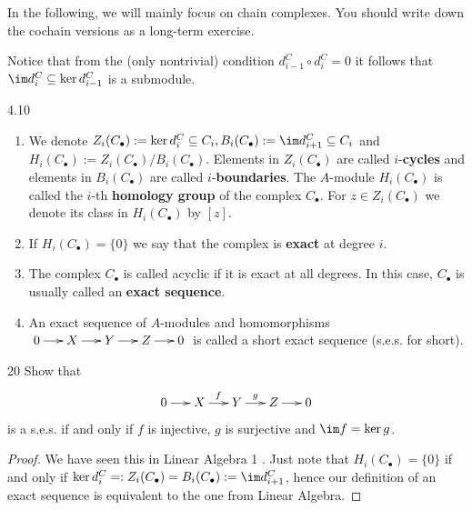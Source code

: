 \documentclass[twoside = false,	%
		headsepline,		%
		parskip = true,
		]{scrbook}						%
\begin{document}
        In the following, we will mainly focus on chain complexes. You should write down the cochain versions as a long-term exercise.

        Notice that from the (only nontrivial) condition $d_{i-1}^C \circ d_i^C = 0$ it follows that $\im d_i^C \subseteq \ker d_{i-1}^C$ is a submodule.

        \begin{definition}{}{4.10}
            \begin{enumerate}
                \item We denote $Z_i(C_\bullet):= \ker d_i^C \subseteq C_i, B_i(C_\bullet):=\im d_{i+1}^C \subseteq C_i$ and $H_i(C_\bullet):= Z_i(C_\bullet)/B_i(C_\bullet)$. Elements in $Z_i(C_\bullet)$ are called $i$-\textbf{cycles} and elements in $B_i(C_\bullet)$ are called $i$-\textbf{boundaries}. The $A$-module $H_i(C_\bullet)$ is called the $i$-th \textbf{homology group} of the complex $C_\bullet$. For $z \in Z_i(C_\bullet)$ we denote its class in $H_i(C_\bullet)$ by $[z]$.
                
                \item If $H_i(C_\bullet) = \{0\}$ we say that the complex is \textbf{exact} at degree $i$.
                
                \item The complex $C_\bullet$ is called acyclic if it is exact at all degrees. In this case, $C_\bullet$ is usually called an \textbf{exact sequence}.
    
                \item An exact sequence of $A$-modules and homomorphisms $\xymatrix@C=15pt{0 \ar[r] & X \ar[r] & Y \ar[r] & Z \ar[r] & 0}$ is called a short exact sequence (s.e.s. for short).
            \end{enumerate}
        \end{definition}

        \begin{exercise}{}{20}
            Show that
            \begin{equation*}
                \xymatrix@C=15pt {
                    0 \ar[r] & X \ar[r]^f & Y \ar[r]^g & Z \ar[r] & 0
                }
            \end{equation*}
            is a s.e.s. if and only if $f$ is injective, $g$ is surjective and $\im f = \ker g$.
        \end{exercise}
        \begin{proof}
            We have seen this in Linear Algebra 1 \cite{LA}. Just note that $H_i(C_\bullet) = \{0\}$ if and only if $\ker d_i^C =: Z_i(C_\bullet) = B_i(C_\bullet) := \im d_{i+1}^C$, hence our definition of an exact sequence is equivalent to the one from Linear Algebra.
        \end{proof}
\end{document}
